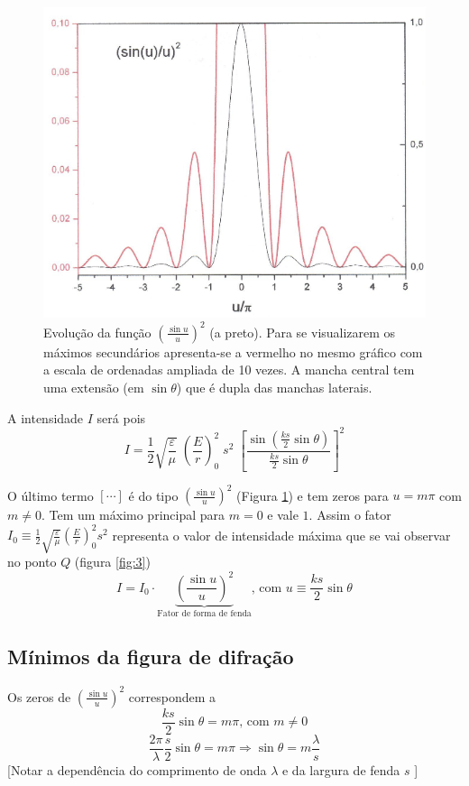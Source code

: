 \documentclass[a4paper,12pt]{article}
\begin{document}
\begin{figure}[htb]  \centering 
	\includegraphics[width=0.7
	\textwidth]{figura4.png} \caption{
	Evolução da função $\left( \frac{\sin u}{u} \right)^2 $ (a preto). Para se visualizarem os máximos secundários apresenta-se a vermelho no mesmo gráfico com a escala de ordenadas ampliada de 10 vezes.
A mancha central tem uma extensão (em $\sin \theta$) que é dupla das manchas laterais. \label{fig:4}} 
\end{figure}

A intensidade $I$ será pois
\begin{equation}
	\label{eq:31} I = \frac{1}{2}\sqrt{\frac{ \varepsilon}{\mu}} \; \left( \frac{E}{r} \right)_0^2 \; s^2 \; \left[ \frac{ \sin( \frac{k s}{2}\sin \theta)}{ \frac{k s}{2}\sin \theta} \right]^2 
\end{equation}

O último termo $\left[ \cdots \right] $  é do tipo $(\frac{\sin u}{u})^2 $ (Figura \ref{fig:4}) e tem zeros para $u = m \pi$ com $m \neq 0$. Tem um máximo principal para $m = 0$ e vale $1$. Assim o fator $I_0 \equiv \frac{1}{2} \sqrt{\frac{ \varepsilon}{\mu}} (\frac{E}{r })_0^2 s^2$ representa o valor de intensidade máxima que se vai observar no ponto $Q$ (figura \ref{fig:3})
\begin{equation}
	\label{eq:32} I = I_0 \cdot \underbrace{\left( \frac{\sin u}{u} \right)^2}_\text{Fator de forma de fenda} \text{, com } u\equiv \frac{k s}{2}\sin \theta 
\end{equation}

\subsection{ \sf Mínimos da figura de difração}
Os zeros de $(\frac{\sin u}{u})^2 $ correspondem a 
\begin{equation}
	\label{eq:33} \frac{k s}{2}\sin \theta = m \pi \text{, com } m \ne 0 
\end{equation}
\begin{equation}
	\label{eq:34} \frac{2 \pi}{\lambda} \frac{ s}{2} \sin \theta = m \pi \Rightarrow \sin \theta = m \frac{\lambda}{s} 
\end{equation}
[Notar a dependência do comprimento de onda  $\lambda$ e da largura de fenda $s$ ]
\end{document}
